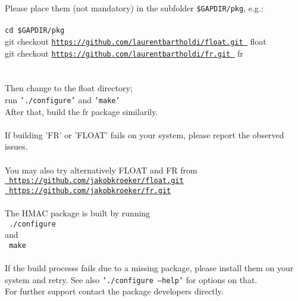 \documentclass[a4paper,11pt]{report}
\begin{document}
{ Please place them (not mandatory) in the subfolder \texttt{\$GAPDIR/pkg}, e.g.:\\
\\
 \texttt{cd \$GAPDIR/pkg }\\
 git checkout \href{https://github.com/laurentbartholdi/float.git } {\texttt{https://github.com/laurentbartholdi/float.git }} float\\
 git checkout \href{https://github.com/laurentbartholdi/fr.git } {\texttt{https://github.com/laurentbartholdi/fr.git }} fr\\
\\
\\
 Then change to the float directory; \\
 run \texttt{'./configure'} and \texttt{'make'}\\
 After that, build the fr package similarily.\\
\\
 If building 'FR' or 'FLOAT' fails on your system, please report the observed
issues.\\
\\
 You may also try alternatively FLOAT and FR from \\
 \href{ https://github.com/jakobkroeker/float.git} {\texttt{ https://github.com/jakobkroeker/float.git}}\\
 \href{ https://github.com/jakobkroeker/fr.git} {\texttt{ https://github.com/jakobkroeker/fr.git}} \\
\\
 The HMAC package is built by running\\
 \texttt{ {\nobreakspace}{\nobreakspace} ./configure }\\
 and \\
 \texttt{ {\nobreakspace}{\nobreakspace} make }\\
 \\
 If the build processs fails due to a missing package, please install them on
your system and retry. See also \texttt{'./configure --help'} for options on that. \\
 For further support contact the package developers directly. }

 
\end{document}
